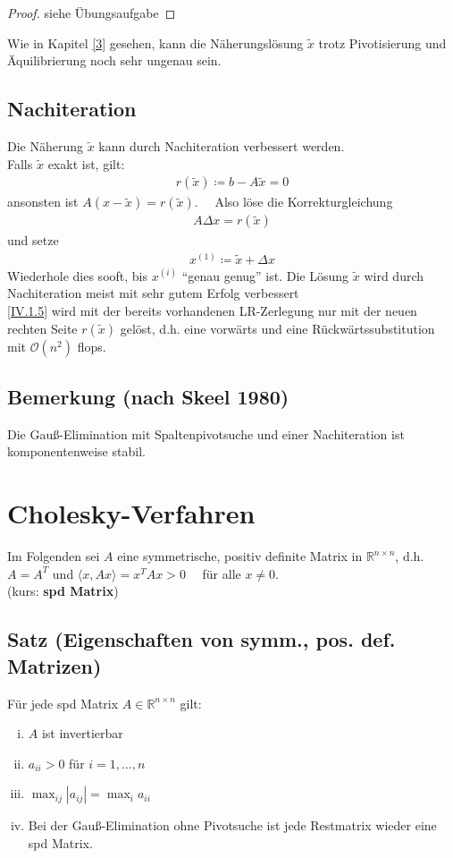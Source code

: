 \documentclass[ngerman,fontsize=11pt, paper=a4, parskip=half, titlepage=true, toc=bib]{scrbook}
\newcommand{\Renn}{\mathds{R}^{n\times n}}
\newcommand{\sectione}[1]{\section{#1} \setcounter{equation}{0}}
\begin{document}
  \begin{proof}
  	siehe Übungsaufgabe
  \end{proof}

Wie in Kapitel \ref{3} gesehen, kann die Näherungslösung $\widetilde{x}$ 
trotz Pivotisierung und Äquilibrierung noch sehr ungenau sein.


\subsection{Nachiteration} 
Die Näherung $\widetilde{x}$ kann durch Nachiteration verbessert werden. \\
Falls $\widetilde{x}$ exakt ist, gilt:
\begin{gather}
	r(\widetilde{x}) \coloneqq b-A\widetilde{x} =0 \label{IV.1.4}
\end{gather}
ansonsten ist $A(x-\widetilde{x})=r(\widetilde{x}).$ \ \
Also löse die Korrekturgleichung
\begin{gather}
	A\Delta x = r(\widetilde{x}) 	\label{IV.1.5}
\end{gather}
und setze
\begin{gather*}
	x^{(1)} \coloneqq \widetilde{x} +\Delta x
\end{gather*}
Wiederhole dies sooft, bis $x^{(i)}$ \enquote{genau genug} ist.
Die Lösung $\widetilde{x}$ wird durch Nachiteration meist mit sehr gutem Erfolg verbessert
\cite[genaueres in ][]{dahmenreusken}\\
\eqref{IV.1.5} wird mit der bereits vorhandenen LR-Zerlegung nur mit der neuen rechten Seite $r(\widetilde{x})$ gelöst, d.h. eine vorwärts und eine Rückwärtssubstitution
mit $\mathcal{O}(n^2)$ flops.

\subsection{Bemerkung (nach Skeel 1980)}
Die Gauß-Elimination mit Spaltenpivotsuche und einer Nachiteration ist komponentenweise stabil.


\sectione{Cholesky-Verfahren}
Im Folgenden sei $A$ eine symmetrische, positiv definite Matrix in $\Renn $, d.h.
$A=A^T$ und $\langle x, Ax \rangle = x^TAx > 0 \quad $ für alle $ x\neq 0$. \\
(kurs: \textbf{spd Matrix}) \index{spd Matrix}

\subsection{Satz (Eigenschaften von symm., pos. def. Matrizen)} \label{4.2.1}
Für jede spd Matrix $A\in \Renn $ gilt:
\begin{enumerate}[i)]	
	\item $A$ ist invertierbar
	\item $a_{ii}>0$ für $i=1, \dots , n$
	\item $\max_{ij}|a_{ij}| = \max_{i}a_{ii}$
	\item Bei der Gauß-Elimination ohne Pivotsuche ist jede Restmatrix wieder eine spd Matrix.
\end{enumerate}
\end{document}
